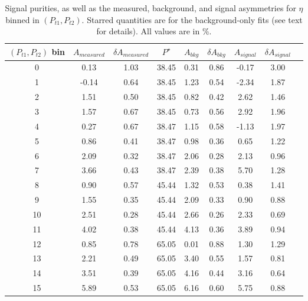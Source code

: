 \begin{table}[H]\footnotesize
\centering
\begin{tabular}{|c|c|c|c|c|c|c|c|c|}
\hline
$(P_{t1},P_{t2})$ bin & $A_{measured}$ & $\delta A_{measured}$ & $P^{\star}$ & $A_{bkg}$ & $\delta A_{bkg}$ & $A_{signal}$ & $\delta A_{signal}$ \\ \hline \hline
0 & 0.13 & 1.03 & 38.45 & 0.31 & 0.86 & -0.17  & 3.00 \\ \hline 
1 & -0.14 & 0.64 & 38.45 & 1.23 & 0.54 & -2.34  & 1.87 \\ \hline 
2 & 1.51 & 0.50 & 38.45 & 0.82 & 0.42 & 2.62 & 1.46 \\ \hline 
3 & 1.57 & 0.67 & 38.45 & 0.73 & 0.56 & 2.92  & 1.96 \\ \hline \hline
4 & 0.27 & 0.67 & 38.47 & 1.15 & 0.58 & -1.13 & 1.97 \\ \hline 
5 & 0.86 & 0.41 & 38.47 & 0.98 & 0.36 & 0.65 & 1.22 \\ \hline 
6 & 2.09 & 0.32 & 38.47 & 2.06 & 0.28 & 2.13 & 0.96 \\ \hline 
7 & 3.66 & 0.43 & 38.47 & 2.39 & 0.38 & 5.70  & 1.28 \\ \hline \hline
8 & 0.90 & 0.57 & 45.44 & 1.32 & 0.53 & 0.38  & 1.41 \\ \hline 
9 & 1.55 & 0.35 & 45.44 & 2.09 & 0.33 & 0.90  & 0.88 \\ \hline 
10 & 2.51 & 0.28 & 45.44 & 2.66 & 0.26 & 2.33 & 0.69 \\ \hline 
11 & 4.02 & 0.38 & 45.44 & 4.13 & 0.36 & 3.89& 0.94 \\ \hline \hline
12 & 0.85 & 0.78 & 65.05 & 0.01 & 0.88 & 1.30  & 1.29 \\ \hline 
13 & 2.21 & 0.49 & 65.05 & 3.40 & 0.55 & 1.57  & 0.81 \\ \hline 
14 & 3.51 & 0.39 & 65.05 & 4.16 & 0.44 & 3.16 & 0.64 \\ \hline 
15 & 5.89 & 0.53 & 65.05 & 6.16 & 0.60 & 5.75 & 0.88 \\ \hline 
\end{tabular}
\caption[BG-correction quantities for $\eta$ asymmetries, $(P_{t1},P_{t2})$ bins]{Signal purities, as well as the measured, background, and signal asymmetries for $\eta$ binned in $(P_{t1},P_{t2})$. Starred quantities are for the background-only fits (see text for details). All values are in \%.}
\label{tab:etacomptbkgcor}
\end{table} 

